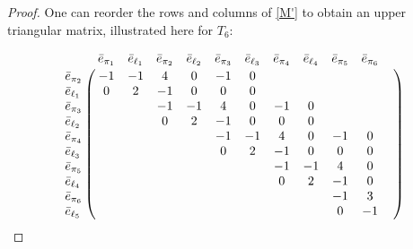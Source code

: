 \documentclass[10pt,reqno]{amsart}
\begin{document}
\begin{proof}
\noindent
One can reorder the rows and columns of \eqref{M'} to obtain an upper triangular matrix, illustrated here for $T_6$: 

\small
\begin{equation*}
\bordermatrix{
~ & \bar{e}_{\pi_{1}} & \bar{e}_{\ell_{1}} & \bar{e}_{\pi_{2}} & \bar{e}_{\ell_{2}} & \bar{e}_{\pi_{3}} & \bar{e}_{\ell_{3}}& \bar{e}_{\pi_{4}} & \bar{e}_{\ell_{4}}& \bar{e}_{\pi_{5}} & \bar{e}_{\pi_{6}} \cr
%
\bar{e}_{\pi_{2}}&-1 &-1 &4 &0 &-1 &0 & & & &  \cr
\bar{e}_{\ell_{1}}& 0& 2& -1& 0& 0&0 & & & &  \cr
%
\bar{e}_{\pi_{3}} & & &-1 &-1 &4 &0 &-1 &0 & &  \cr
\bar{e}_{\ell_{2}}& & & 0& 2& -1& 0& 0&0 & &  \cr
%
\bar{e}_{\pi_{4}} & & &  & &-1 &-1 &4 &0 &-1 &0  \cr
\bar{e}_{\ell_{3}}& & & & & 0& 2& -1& 0& 0&0  \cr
%
\bar{e}_{\pi_{5}} & & & & &  & &-1 &-1 &4 &0  \cr
\bar{e}_{\ell_{4}}& & & & & & & 0& 2& -1& 0  \cr
%
\bar{e}_{\pi_{6}} & & & & & & &  & &-1 &3  \cr
\bar{e}_{\ell_{5}}& & & & & & & & & 0& -1&  \cr
}
\end{equation*}
\vspace{.3cm}
\normalsize
\noindent


\end{proof}
\end{document}
